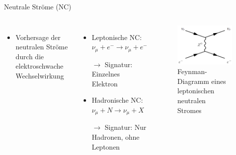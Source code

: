 \documentclass[aspectratio=1610, professionalfonts, 10pt]{beamer}
\begin{document}
\begin{frame}{Neutrale Ströme (NC)}
	\begin{columns}
				\begin{itemize}
					  \setlength\itemsep{0.5em}
					\item Vorhersage der neutralen Ströme durch die elektroschwache Wechselwirkung
				\end{itemize}
				\vspace*{20px}
				\begin{itemize}
					\setlength\itemsep{0.5em}
					\item Leptonische NC: $\nu_\mu + e^- \rightarrow \nu_\mu + e^-$
					\item[$\rightarrow$] Signatur: Einzelnes Elektron
					\item Hadronische NC: $\nu_\mu + N \rightarrow \nu_\mu + X$
					\item[$\rightarrow$] Signatur: Nur Hadronen, ohne Leptonen
				\end{itemize}
			\begin{figure}
	  			\centering
				\includegraphics[width=\linewidth]{Images/Neutral_current,_leptonic_event,_muon_neutrino.png}
	  			\caption{Feynman-Diagramm eines leptonischen neutralen Stromes \cite{wiki:NC}}
	  			\label{fig:feynman}
			\end{figure}
	\end{columns}
\end{frame}
\end{document}

